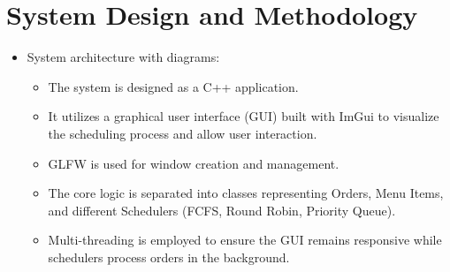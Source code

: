 \documentclass[a4paper,12pt]{article}
\begin{document}
\section{System Design and Methodology}
\RaggedRight %
\begin{itemize}
    \item System architecture with diagrams:
        \begin{itemize}
            \item The system is designed as a C++ application. 
            \item It utilizes a graphical user interface (GUI) built with ImGui to visualize the scheduling process and allow user interaction.
            \item GLFW is used for window creation and management.
            \item The core logic is separated into classes representing Orders, Menu Items, and different Schedulers (FCFS, Round Robin, Priority Queue).
            \item Multi-threading is employed to ensure the GUI remains responsive while schedulers process orders in the background.
            

\end{itemize}
\end{itemize}
\end{document}
